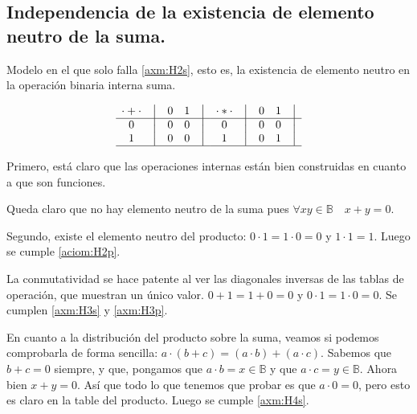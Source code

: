 \documentclass[final,12pt,a4paper,twoside,fleqn]{extbook}
\newcommand{\setB}{\ensuremath{\mathbb{B}}}
\theoremstyle{definition}
\theoremstyle{remark}
\begin{document}
\subsection{Independencia de la existencia de elemento neutro de la suma.}



Modelo en el que solo falla \ref{axm:H2s}, esto es, la existencia de
elemento neutro en la operación binaria interna suma.



\[
    \begin{matrix}
        {\cdot + \cdot} & \big{\vert} & {0} & {1} & \big{\vert} \\
        \hline
        {0}             & \big{\vert} & {0} & {0} & \big{\vert} \\
        {1}             & \big{\vert} & {0} & {0} & \big{\vert} \\
        \hline
    \end{matrix}
    \quad
    \begin{matrix}
        {\cdot * \cdot} & \big{\vert} & {0} & {1} & \big{\vert} \\
        \hline
        {0}                   & \big{\vert} & {0} & {0} & \big{\vert} \\
        {1}                   & \big{\vert} & {0} & {1} & \big{\vert} \\
        \hline
    \end{matrix}
\]


	Primero, está claro que las operaciones internas están bien construidas
en cuanto a que son funciones.


	Queda claro que no hay elemento neutro de la suma pues \(\forall xy \in
\setB \quad x + y = 0\).


	Segundo, existe el elemento neutro del producto: \(0 \cdot 1 = 1 \cdot 0
= 0 \) y \( 1 \cdot 1 = 1 \). Luego se cumple \ref{aciom:H2p}.



	La conmutatividad se hace patente al ver las diagonales inversas de las
tablas de operación, que muestran un único valor. \( 0 + 1 = 1 + 0 = 0\) y
\(0 \cdot 1 = 1 \cdot 0 = 0\). Se cumplen \ref{axm:H3s} y \ref{axm:H3p}. 



	En cuanto a la distribución del producto sobre la suma, veamos si podemos
comprobarla de forma sencilla: \( a \cdot ( b + c ) = (a \cdot b) + (a \cdot
c) \). Sabemos que \(b + c = 0\) siempre, y que, pongamos que \(a \cdot b = x
\in \setB\) y que \(a \cdot c = y \in \setB\). Ahora bien \(x + y = 0\). Así
que todo lo que tenemos que probar es que \(a \cdot 0 = 0\), pero esto es
claro en la table del producto. Luego se cumple \ref{axm:H4s}.
\end{document}
